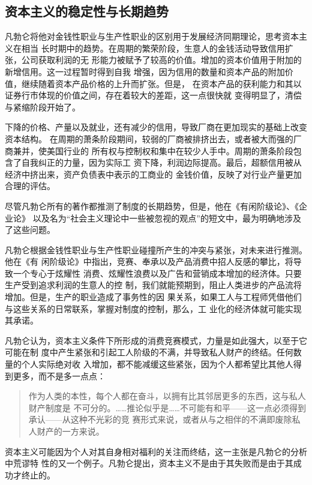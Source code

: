 \clearpage

\subsection{资本主义的稳定性与长期趋势}

凡勃仑将他对金钱性职业与生产性职业的区别用于发展经济同期理论，思考资本主义在相当
长时期中的趋势。在周期的繁荣阶段，生意人的金钱活动导致信用扩张，公司获取利润的无
形能力被赋予了较高的价值。增加的资本价值用于附加的新增信用。这一过程暂时得到自我
增强，因为信用的数量和资本产品的附加价值，继续随着资本产品价格的上升而扩张。但是，
在资本产品的获利能力和其以证券行市体现的价值之间，存在着较大的差距，这一点很快就
变得明显了，清偿与紧缩阶段开始了。

下降的价格、产量以及就业，还有减少的信用，导致厂商在更加现实的基础上改变资本结构。
在周期的萧条阶段期间，较弱的厂商被排挤出去，或者被大而强的厂商兼并，使美国行业的
所有权与控制权和集中在较少人手中。周期的萧条阶段包含了自我纠正的力量，因为实际工
资下降，利润边际提高。最后，超额信用被从经济中挤出来，资产负债表中表示的工商业的
金钱价值，反映了对行业产量更加合理的评估。

尽管凡勃仑所有的著作都推测了制度的长期趋势，但是，他在《有闲阶级论》、《企业论》
以及名为“社会主义理论中一些被忽视的观点”的短文中，最为明确地涉及了这些问题。

凡勃仑根据金钱性职业与生产性职业碰撞所产生的冲突与紧张，对未来进行推测。他在《有
闲阶级论》中指出，竞赛、奉承以及产品消费中招人反感的攀比，将导致一个专心于炫耀性
消费、炫耀性浪费以及广告和营销成本增加的经济体。只要生产受到追求利润的生意人的控
制，我们就能预期到，阻止人类进步的产品流将增加。但是，生产的职业造成了事务性的因
果关系，如果工人与工程师凭借他们与这些关系的日常联系，掌握对制度的控制，那么，工
业化的经济体就可能实现其承诺。

凡勃仑认为，资本主义条件下所形成的消费竞赛模式，力量是如此强大，以至于它可能在制
度中产生紧张和引起工人阶级的不满，并导致私人财产的终结。任何数量的个人实际绝对收
入增加，都不能减缓这些紧张，因为个人都希望比其他人得到更多，而不是多一点点：
\begin{quotation}
  作为人类的本性，每个人都在奋斗，以拥有比其邻居更多的东西，这与私人财产制度是
  不可分的。……推论似乎是……不可能有和平——这一点必须得到承认——从这种不光彩的竞
  赛形式来说，或者从与之相伴的不满即废除私人财产的一方来说。
\end{quotation}

资本主义可能因为个人对其自身相对福利的关注而终结，这一主张是凡勃仑的分析中荒谬特
性的又一个例子。凡勃仑提出，资本主义不是由于其失败而是由于其成功才终止的。


